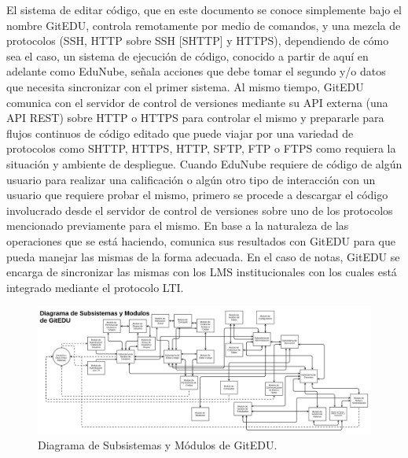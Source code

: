       
El sistema de editar código, que en este documento se conoce simplemente bajo el nombre GitEDU, controla remotamente por medio de comandos, y una mezcla de protocolos (SSH, HTTP sobre SSH [SHTTP] y HTTPS), dependiendo de cómo sea el caso, un sistema de ejecución de código, conocido a partir de aquí en adelante como EduNube, señala acciones que debe tomar el segundo y/o datos que necesita sincronizar con el primer sistema. Al mismo tiempo, GitEDU comunica con el servidor de control de versiones mediante su API externa (una API REST) sobre HTTP o HTTPS para controlar el mismo y prepararle para flujos continuos de código editado que puede viajar por una variedad de protocolos como SHTTP, HTTPS, HTTP, SFTP, FTP o FTPS como requiera la situación y ambiente de despliegue. Cuando EduNube requiere de código de algún usuario para realizar una calificación o algún otro tipo de interacción con un usuario que requiere probar el mismo, primero se procede a descargar el código involucrado desde el servidor de control de versiones sobre uno de los protocolos mencionado previamente para el mismo. En base a la naturaleza de las operaciones que se está haciendo, comunica sus resultados con GitEDU para que pueda manejar las mismas de la forma adecuada. En el caso de notas, GitEDU se encarga de sincronizar las mismas con los LMS  institucionales con los cuales está integrado mediante el protocolo LTI.

\pagebreak

\begin{landscape}

	\begin{figure}
	  \begin{center}
	    \includegraphics[width=1.7\textwidth]{Figures/mod_ge.png}
	  \end{center}
	  \caption{Diagrama de Subsistemas y Módulos de GitEDU.}
	  \label{mod_ge}
	\end{figure}

\end{landscape}

